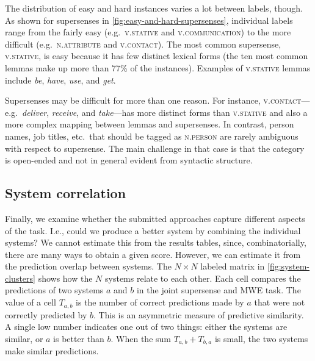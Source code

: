 \documentclass[11pt,letterpaper]{article}
\newcommand{\ensuretext}[1]{#1}
\newcommand{\nssmarker}{\ensuretext{\textcolor{magenta}{\ensuremath{^{\textsc{NS}}_{\textsc{S}}}}}}
\newcommand{\arkcomment}[3]{\ensuretext{\textcolor{#3}{[#1 #2]}}}
\newcommand{\nss}[1]{\arkcomment{\nssmarker}{#1}{magenta}}
\begin{document}
The distribution of easy and hard instances varies a lot between labels, though. 
As shown for supersenses in \cref{fig:easy-and-hard-supersenses}, 
individual labels range from the fairly easy (e.g.\ \textsc{v.stative} and \textsc{v.communication}) 
to the more difficult (e.g.\ \textsc{n.attribute} and \textsc{v.contact}). 
The most common supersense, \textsc{v.stative}, is easy because it has few distinct lexical forms 
(the ten most common lemmas make up more than 77\% of the instances).
Examples of \textsc{v.stative} lemmas include \emph{be}, \emph{have}, \emph{use}, and \emph{get}. 

Supersenses may be difficult for more than one reason. 
For instance, \textsc{v.contact}---e.g.\ \emph{deliver}, \emph{receive}, and \emph{take}---has more distinct forms 
than \textsc{v.stative} and also a more complex mapping between lemmas and supersenses. 
In contrast, person names, job titles, etc.\ that should be tagged as \textsc{n.person} are rarely ambiguous
with respect to supersense. The main challenge in that case is that the category is open-ended 
and not in general evident from syntactic structure.

\subsection{System correlation}

Finally, we examine whether the submitted approaches capture different aspects of the task. 
I.e., could we produce a better system by combining the individual systems? 
We cannot estimate this from the results tables, since, combinatorially, 
there are many ways to obtain a given score. 
However, we can estimate it from the prediction overlap between systems.
The $N \times N$ labeled matrix in \cref{fig:system-clusters} 
shows how the $N$ systems relate to each other. 
Each cell compares the predictions of two systems $a$ and $b$ in the joint supersense and MWE task. 
The value of a cell $T_{a,b}$ is the number of correct predictions made by $a$ 
that were not correctly predicted by $b$. This is an asymmetric measure of predictive similarity. 
A single low number indicates one out of two things: either the systems are similar, or $a$ is better than $b$. 
When the sum $T_{a,b} + T_{b,a}$ is small, the two systems make similar predictions. 
\end{document}
